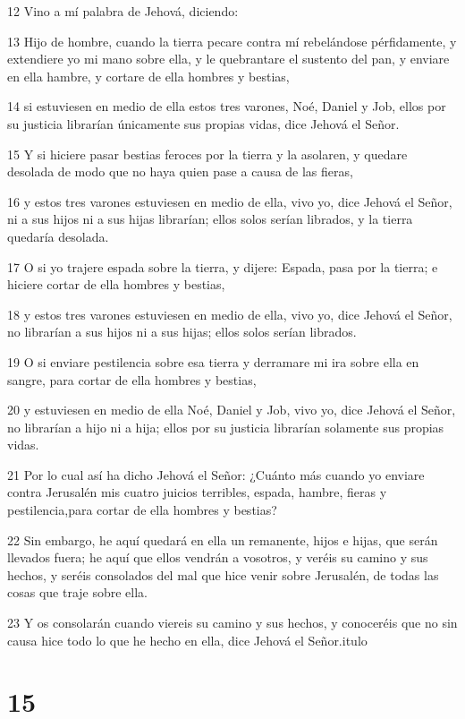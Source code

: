 \par 12 Vino a mí palabra de Jehová, diciendo:
\par 13 Hijo de hombre, cuando la tierra pecare contra mí rebelándose pérfidamente, y extendiere yo mi mano sobre ella, y le quebrantare el sustento del pan, y enviare en ella hambre, y cortare de ella hombres y bestias,
\par 14 si estuviesen en medio de ella estos tres varones, Noé, Daniel y Job, ellos por su justicia librarían únicamente sus propias vidas, dice Jehová el Señor.
\par 15 Y si hiciere pasar bestias feroces por la tierra y la asolaren, y quedare desolada de modo que no haya quien pase a causa de las fieras,
\par 16 y estos tres varones estuviesen en medio de ella, vivo yo, dice Jehová el Señor, ni a sus hijos ni a sus hijas librarían; ellos solos serían librados, y la tierra quedaría desolada.
\par 17 O si yo trajere espada sobre la tierra, y dijere: Espada, pasa por la tierra; e hiciere cortar de ella hombres y bestias, 
\par 18 y estos tres varones estuviesen en medio de ella, vivo yo, dice Jehová el Señor, no librarían a sus hijos ni a sus hijas; ellos solos serían librados.
\par 19 O si enviare pestilencia sobre esa tierra y derramare mi ira sobre ella en sangre, para cortar de ella hombres y bestias,
\par 20 y estuviesen en medio de ella Noé, Daniel y Job, vivo yo, dice Jehová el Señor, no librarían a hijo ni a hija; ellos por su justicia librarían solamente sus propias vidas.
\par 21 Por lo cual así ha dicho Jehová el Señor: ¿Cuánto más cuando yo enviare contra Jerusalén mis cuatro juicios terribles, espada, hambre, fieras y pestilencia,para cortar de ella hombres y bestias?
\par 22 Sin embargo, he aquí quedará en ella un remanente, hijos e hijas, que serán llevados fuera; he aquí que ellos vendrán a vosotros, y veréis su camino y sus hechos, y seréis consolados del mal que hice venir sobre Jerusalén, de todas las cosas que traje sobre ella.
\par 23 Y os consolarán cuando viereis su camino y sus hechos, y conoceréis que no sin causa hice todo lo que he hecho en ella, dice Jehová el Señor.itulo

\chapter{15}

